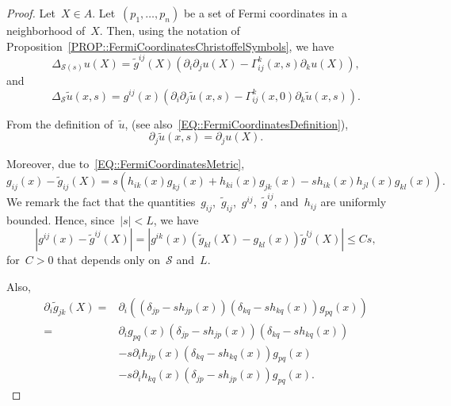 \documentclass[12pt,a4paper]{amsart}
\numberwithin{equation}{section}
\theoremstyle{definition}
\theoremstyle{remark}
\newcommand{\abs}[1]{\left\lvert#1\right\rvert}
\renewcommand{\leq}{\leqslant}
\begin{document}
\begin{proof}
    Let~$X \in A$. Let~$(p_1,\dots,p_n)$ be a set of Fermi coordinates in a neighborhood of~$X$. Then, using the notation of Proposition~\ref{PROP::FermiCoordinatesChristoffelSymbols}, we have
    \begin{equation}\label{EQ::LaplaceBeltramiSigmaS}
        \Delta_{\mathcal{S}(s)}u(X) = \tilde{g}^{ij}(X) \left( \partial_i \partial_j u(X) - \Gamma_{ij}^k(x,s) \partial_k u(X) \right),
    \end{equation}
    and
    \begin{equation}\label{EQ::LaplaceBeltramiSigma0}
        \Delta_{\mathcal{S}}\tilde{u}(x,s) = g^{ij}(x) \left( \partial_i \partial_j \tilde{u}(x,s) - \Gamma_{ij}^k(x,0) \partial_k \tilde{u}(x,s)\right).
    \end{equation}

    From the definition of~$\tilde{u}$, (see also~\eqref{EQ::FermiCoordinatesDefinition}),
    \begin{equation}\label{EQ::PartialDerivativeCorrespondence}
        \partial_j \tilde{u}(x,s) = \partial_j u(X).
    \end{equation}
    
    Moreover, due to~\eqref{EQ::FermiCoordinatesMetric},
    \begin{equation}
        g_{ij}(x) - \tilde{g}_{ij}(X) = s \left( h_{ik}(x)g_{kj}(x) + h_{ki}(x)g_{jk}(x) - s h_{ik}(x)h_{jl}(x)g_{kl}(x)\right).
    \end{equation}
    We remark the fact that the quantities~$g_{ij}$,~$\tilde{g}_{ij}$,~$g^{ij}$,~$\tilde{g}^{ij}$, and~$h_{ij}$ are uniformly bounded. Hence, since~$\abs{s} < L$, we have
    \begin{equation}\label{EQ::gijInverseEstimate}
        \abs{g^{ij}(x) - \tilde{g}^{ij}(X)} = \abs{g^{ik}(x) \left(\tilde{g}_{kl}(X) - g_{kl}(x)\right) \tilde{g}^{lj}(X)} \leq C s,
    \end{equation}
    for~$C > 0$ that depends only on~$\mathcal{S}$ and~$L$.

    Also,
    \begin{align}
        \partial_i \tilde{g}_{jk}(X) =  &\partial_i \left((\delta_{jp} - s h_{jp}(x))(\delta_{kq} - s h_{kq}(x)) g_{pq}(x)\right)\\
                                     =  &\partial_i g_{pq}(x)(\delta_{jp} - s h_{jp}(x))(\delta_{kq} - s h_{kq}(x))\\
                                        &- s\partial_i h_{jp}(x)(\delta_{kq} - s h_{kq}(x)) g_{pq}(x)\\
                                        &- s\partial_i h_{kq}(x)(\delta_{jp} - s h_{jp}(x)) g_{pq}(x).
    \end{align}


\end{proof}
\end{document}
